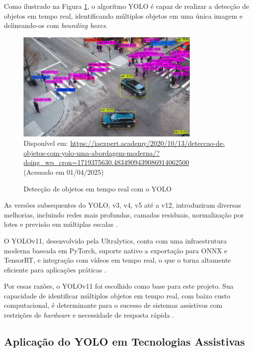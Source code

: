 Como ilustrado na Figura \ref{fg2}, o algoritmo YOLO é capaz de realizar a detecção de objetos em tempo real, identificando múltiplos objetos em uma única imagem e delineando-os com \textit{bounding boxes}.

\begin{figure}[htbp]
  \centering
  \caption{Detecção de objetos em tempo real com o YOLO}
  \includegraphics[width=0.8\textwidth]{Figuras/detec-yolo.png}
  \\
  Disponível em: \url{https://iaexpert.academy/2020/10/13/deteccao-de-objetos-com-yolo-uma-abordagem-moderna/?doing_wp_cron=1719375630.4834909439086914062500 } \\(Acessado em 01/04/2025)
  \label{fg2}
\end{figure}

As versões subsequentes do YOLO, v3, v4, v5 até a v12, introduziram diversas melhorias, incluindo redes mais profundas, camadas residuais, normalização por lotes e previsão em múltiplas escalas \cite{bochkovskiy2020}.

O YOLOv11, desenvolvido pela Ultralytics, conta com uma infraestrutura moderna baseada em PyTorch, suporte nativo a exportação para ONNX e TensorRT, e integração com vídeos em tempo real, o que o torna altamente eficiente para aplicações práticas \cite{Ultralytics2024}.

Por essas razões, o YOLOv11 foi escolhido como base para este projeto. Sua capacidade de identificar múltiplos objetos em tempo real, com baixo custo computacional, é determinante para o sucesso de sistemas assistivos com restrições de \textit{hardware} e necessidade de resposta rápida \cite{bochkovskiy2020}.

\subsection{Aplicação do YOLO em Tecnologias Assistivas}

